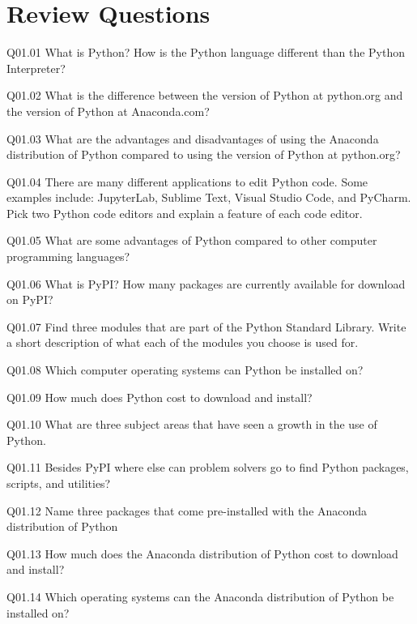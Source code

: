 \documentclass{book}
\newenvironment{problems}{}{}  %
\begin{document}
    




    
        \section{Review Questions}\label{review-questions}
    




    
        \begin{problems}
        Q01.01 What is Python? How is the Python language different than the
Python Interpreter?

Q01.02 What is the difference between the version of Python at
python.org and the version of Python at Anaconda.com?

Q01.03 What are the advantages and disadvantages of using the Anaconda
distribution of Python compared to using the version of Python at
python.org?

Q01.04 There are many different applications to edit Python code. Some
examples include: JupyterLab, Sublime Text, Visual Studio Code, and
PyCharm. Pick two Python code editors and explain a feature of each code
editor.

Q01.05 What are some advantages of Python compared to other computer
programming languages?

Q01.06 What is PyPI? How many packages are currently available for
download on PyPI?

Q01.07 Find three modules that are part of the Python Standard Library.
Write a short description of what each of the modules you choose is used
for.

Q01.08 Which computer operating systems can Python be installed on?

Q01.09 How much does Python cost to download and install?

Q01.10 What are three subject areas that have seen a growth in the use
of Python.

Q01.11 Besides PyPI where else can problem solvers go to find Python
packages, scripts, and utilities?

Q01.12 Name three packages that come pre-installed with the Anaconda
distribution of Python

Q01.13 How much does the Anaconda distribution of Python cost to
download and install?

Q01.14 Which operating systems can the Anaconda distribution of Python
be installed on?


\end{problems}
\end{document}
